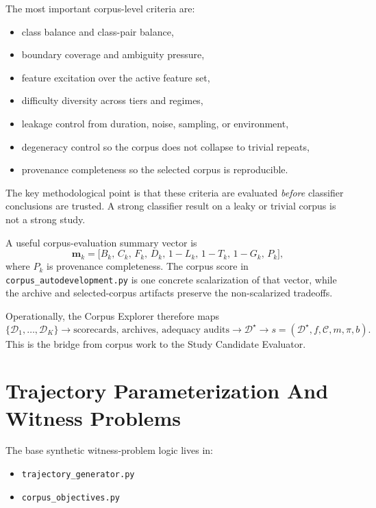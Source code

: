\documentclass[11pt]{article}
\begin{document}
The most important corpus-level criteria are:
\begin{itemize}[leftmargin=1.5em]
    \item class balance and class-pair balance,
    \item boundary coverage and ambiguity pressure,
    \item feature excitation over the active feature set,
    \item difficulty diversity across tiers and regimes,
    \item leakage control from duration, noise, sampling, or environment,
    \item degeneracy control so the corpus does not collapse to trivial repeats,
    \item provenance completeness so the selected corpus is reproducible.
\end{itemize}
The key methodological point is that these criteria are evaluated
\emph{before} classifier conclusions are trusted. A strong classifier result on
a leaky or trivial corpus is not a strong study.

A useful corpus-evaluation summary vector is
\begin{equation}
    \mathbf{m}_k
    =
    \big[
        B_k,\,
        C_k,\,
        F_k,\,
        D_k,\,
        1-L_k,\,
        1-T_k,\,
        1-G_k,\,
        P_k
    \big],
\end{equation}
where \(P_k\) is provenance completeness. The corpus score in
\texttt{corpus\_autodevelopment.py} is one concrete scalarization of that
vector, while the archive and selected-corpus artifacts preserve the
non-scalarized tradeoffs.

Operationally, the Corpus Explorer therefore maps
\begin{equation}
\{ \mathcal{D}_1, \dots, \mathcal{D}_K \}
\rightarrow
\text{scorecards, archives, adequacy audits}
\rightarrow
\mathcal{D}^{\star}
\rightarrow
s = (\mathcal{D}^{\star}, f, \mathcal{C}, m, \pi, b).
\end{equation}
This is the bridge from corpus work to the Study Candidate Evaluator.

\section{Trajectory Parameterization And Witness Problems}

The base synthetic witness-problem logic lives in:
\begin{itemize}[leftmargin=1.5em]
    \item \texttt{trajectory\_generator.py}
    \item \texttt{corpus\_objectives.py}
\end{itemize}
\end{document}
